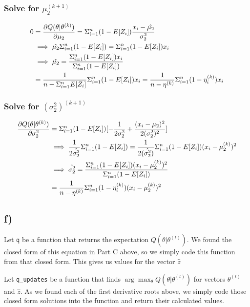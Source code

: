 \documentclass[]{article}
\begin{document}
\subsubsection{\texorpdfstring{Solve for
\(\mu_2^{(k + 1)}\)}{Solve for \textbackslash{}mu\_2\^{}\{(k + 1)\}}}\label{solve-for-mu_2k-1}

\begin{align*}
0 &= \frac{\partial Q(\theta | \theta^{(k)})}{\partial \mu_2} = \Sigma_{i=1}^{n} (1 - E[Z_i]) \frac{x_i - \hat{\mu_2}}{\sigma_2^2} \\
&\implies \hat{\mu_2} \Sigma_{i=1}^{n} (1 - E[Z_i]) = \Sigma_{i=1}^{n}(1 - E[Z_i])x_i \\ 
&\implies \hat{\mu_2} = \frac{\Sigma_{i=1}^{n}(1- E[Z_i])x_i}{\Sigma_{i=1}^{n}(1- E[Z_i])} \\ 
&= \frac{1}{n - \Sigma_{i=1}^{n} E[Z_i]} \Sigma_{i=1}^{n}(1 - E[Z_i])x_i = \frac{1}{n - \eta^{(k)}} \Sigma_{i=1}^{n}(1 - \eta_i^{(k)})x_i
\end{align*}

\subsubsection{\texorpdfstring{Solve for
\((\sigma_2^2)^{(k + 1)}\)}{Solve for (\textbackslash{}sigma\_2\^{}2)\^{}\{(k + 1)\}}}\label{solve-for-sigma_22k-1}

\begin{align*}
\frac{\partial Q(\theta | \theta^{(k)})}{\partial \sigma_2^{2}} &= \Sigma_{i=1}^{n}(1 - E[Z_i])[-\frac{1}{2 \sigma_2^2} + \frac{(x_i -\mu_2)^2}{2(\sigma_2^2)^2}] \\
&\implies \frac{1}{2\hat{\sigma_2^2}} \Sigma_{i=1}^{n}(1 - E[Z_i]) = \frac{1}{2(\hat{\sigma_2^2})} \Sigma_{i=1}^{n} (1 - E[Z_i])(x_i - \mu_2^{(k)})^2 \\
&\implies \hat{\sigma_2^2} = \frac{\Sigma_{i=1}^{n} (1 - E[Z_i]) (x_i - \mu_2^{(k)})^2}{\Sigma_{i=1}^{n}(1 - E[Z_i])}  \\
&= \frac{1}{n - \eta^{(k)}} \Sigma_{i=1}^{n} (1 - \eta^{(k)}_i)(x_i - \mu_2^{(k)})^2
\end{align*}

\subsection{f)}\label{f}

Let \texttt{q} be a function that returns the expectation
\(Q(\theta | \theta^{(t)})\). We found the closed form of this equation
in Part C above, so we simply code this function from that closed form.
This gives us values for the vector \(\hat{z}\)

Let \texttt{q\_updates} be a function that finds
\(\arg \max_\theta Q(\theta | \theta^{(t)})\) for vectors
\(\theta^{(t)}\) and \(\hat{z}\). As we found each of the first
derivative roots above, we simply code those closed form solutions into
the function and return their calculated values.
\end{document}
